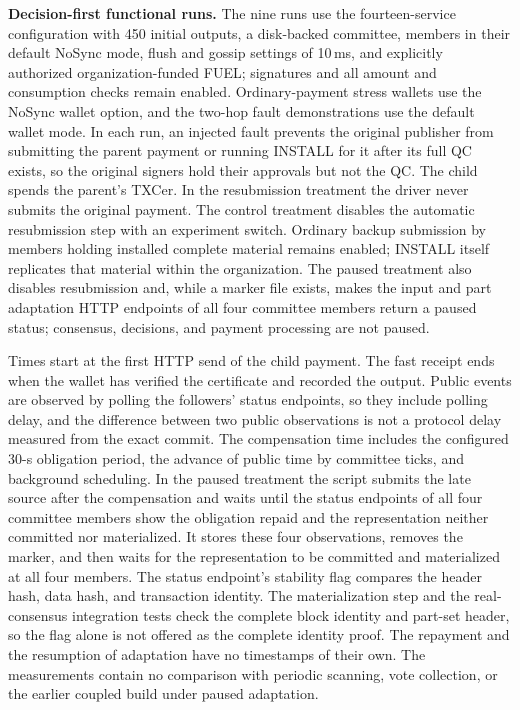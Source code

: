 \noindent\textbf{Decision-first functional runs.}
The nine runs use the fourteen-service configuration with 450 initial
outputs, a disk-backed committee, members in their default NoSync mode, flush
and gossip settings of 10\,ms, and explicitly authorized organization-funded FUEL; signatures and all amount
and consumption checks remain enabled. Ordinary-payment stress wallets use the
NoSync wallet option, and the two-hop fault demonstrations use the default
wallet mode. In each run, an injected fault prevents the original publisher
from submitting the parent payment or running INSTALL for it after its full QC exists, so
the original signers hold their approvals but not the QC. The child spends the
parent's TXCer. In the resubmission treatment the driver never submits the
original payment. The control treatment disables the automatic resubmission
step with an experiment switch. Ordinary backup submission by members
holding installed complete material remains enabled; INSTALL itself
replicates that material within the organization. The
paused treatment also disables resubmission and, while a marker file exists,
makes the input and part adaptation HTTP endpoints of all four committee
members return a paused status; consensus, decisions, and payment processing
are not paused.

Times start at the first HTTP send of the child payment. The fast receipt ends
when the wallet has verified the certificate and recorded the output. Public
events are observed by polling the followers' status endpoints, so they
include polling delay, and the difference between two public observations is
not a protocol delay measured from the exact commit. The compensation time
includes the configured 30-s obligation period, the advance of public time by
committee ticks, and background scheduling. In the paused treatment the script
submits the late source after the compensation and waits until the status
endpoints of all four committee members show the obligation repaid and the
representation neither committed nor materialized. It stores these four
observations, removes the marker, and then waits for the representation to be
committed and materialized at all four members. The status endpoint's
stability flag compares the header hash, data hash, and transaction identity.
The materialization step and the real-consensus integration tests check the
complete block identity and part-set header, so the flag alone is not offered
as the complete identity proof. The repayment and the resumption of adaptation
have no timestamps of their own. The measurements contain no comparison with
periodic scanning, vote collection, or the earlier coupled build under paused
adaptation.

